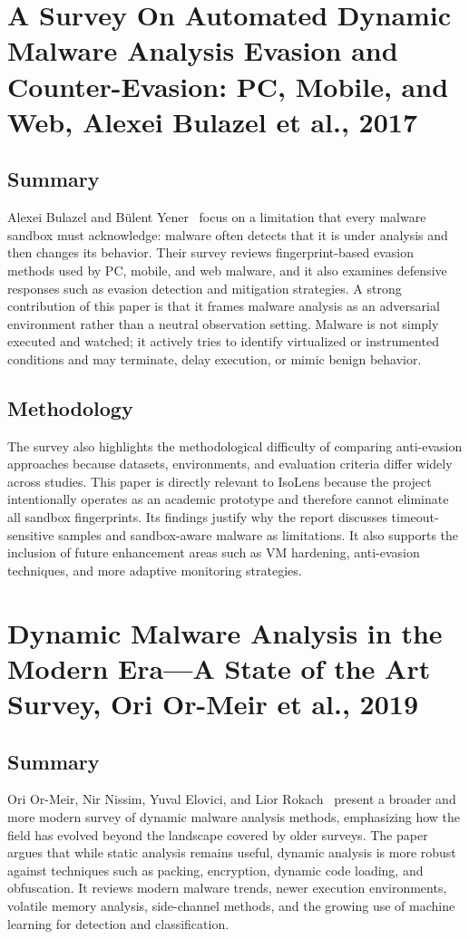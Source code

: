 \documentclass[a4paper,12pt,oneside]{report}
\begin{document}
\section{A Survey On Automated Dynamic Malware Analysis Evasion and Counter-Evasion: PC, Mobile, and Web, Alexei Bulazel et al., 2017}

\subsection{Summary}
Alexei Bulazel and B\"ulent Yener~\cite{bulazel2022} focus on a limitation that every malware sandbox must acknowledge: malware often detects that it is under analysis and then changes its behavior. Their survey reviews fingerprint-based evasion methods used by PC, mobile, and web malware, and it also examines defensive responses such as evasion detection and mitigation strategies. A strong contribution of this paper is that it frames malware analysis as an adversarial environment rather than a neutral observation setting. Malware is not simply executed and watched; it actively tries to identify virtualized or instrumented conditions and may terminate, delay execution, or mimic benign behavior.

\subsection{Methodology}
The survey also highlights the methodological difficulty of comparing anti-evasion approaches because datasets, environments, and evaluation criteria differ widely across studies. This paper is directly relevant to IsoLens because the project intentionally operates as an academic prototype and therefore cannot eliminate all sandbox fingerprints. Its findings justify why the report discusses timeout-sensitive samples and sandbox-aware malware as limitations. It also supports the inclusion of future enhancement areas such as VM hardening, anti-evasion techniques, and more adaptive monitoring strategies.

\section{Dynamic Malware Analysis in the Modern Era---A State of the Art Survey, Ori Or-Meir et al., 2019}

\subsection{Summary}
Ori Or-Meir, Nir Nissim, Yuval Elovici, and Lior Rokach~\cite{ormeir2025} present a broader and more modern survey of dynamic malware analysis methods, emphasizing how the field has evolved beyond the landscape covered by older surveys. The paper argues that while static analysis remains useful, dynamic analysis is more robust against techniques such as packing, encryption, dynamic code loading, and obfuscation. It reviews modern malware trends, newer execution environments, volatile memory analysis, side-channel methods, and the growing use of machine learning for detection and classification.
\end{document}
